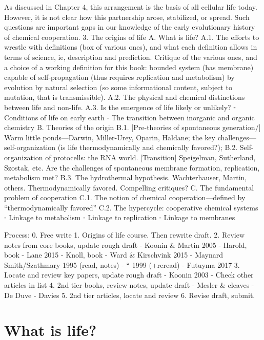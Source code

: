 \documentclass{tufte-book} %
\begin{document}
As discussed in Chapter 4, this arrangement is the basis of all cellular life today. However, it is not clear how this partnership arose, stabilized, or spread. Such questions are important gaps in our knowledge of the early evolutionary history of chemical cooperation.
	3.	The origins of life
	A.	What is life?
	A.1.	The efforts to wrestle with definitions (box of various ones), and what each definition allows in terms of science, ie, description and prediction. Critique of the various ones, and a choice of a working definition for this book: bounded system (has membrane) capable of self-propagation (thus requires replication and metabolism) by evolution by natural selection (so some informational content, subject to mutation, that is transmissible). 
	A.2.	The physical and chemical distinctions between life and non-life.
	A.3.	Is the emergence of life likely or unlikely?
	⁃	Conditions of life on early earth
	⁃	The transition between inorganic and organic chemistry
	B.	Theories of the origin
	B.1.	[Pre-theories of spontaneous generation/] Warm little ponds—Darwin, Miller-Urey, Oparin, Haldane; the key challenges—self-organization (is life thermodynamically and chemically favored?);  
	B.2.	Self-organization of protocells: the RNA world. [Transition] Speigelman, Sutherland, Szostak, etc. Are the challenges of spontaneous membrane formation, replication, metabolism met?
	B.3.	The hydrothermal hypothesis. Wachterhauser, Martin, others. Thermodynamically favored. Compelling critiques?
	C.	The fundamental problem of cooperation
	C.1.	The notion of chemical cooperation—defined by “thermodynamically favored”
	C.2.	The hypercycle: cooperative chemical systems
	⁃	Linkage to metabolism
	⁃	Linkage to replication
	⁃	Linkage to membranes	
	
	
	Process:
0. Free write
1. Origins of life course. Then rewrite draft. 
2. Review notes from core books, update rough draft
	- Koonin & Martin 2005
	- Harold, book 
	- Lane 2015
	- Knoll, book
	- Ward & Kirschvink 2015
	- Maynard Smith/Szathmary 1995 (read, notes)
	- “ 1999 (+reread)
	- Futuyma 2017
3. Locate and review key papers, update rough draft
	- Koonin 2003
	- Check other articles in list
4. 2nd tier books, review notes, update draft
	- Mesler & cleaves
	- De Duve
	- Davies
5. 2nd tier articles, locate and review
6. Revise draft, submit.






\section{What is life?}\label{defining-life}
\end{document}
